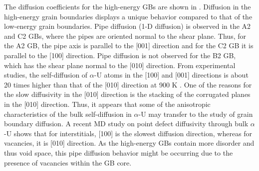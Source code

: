 \documentclass[review]{elsarticle}
\begin{document}
\par The diffusion coefficients for the high-energy GBs are shown in . Diffusion in the high-energy grain boundaries displays a unique behavior compared to that of the low-energy grain boundaries. Pipe diffusion (1-D diffusion) is observed in the A2 and C2 GBs, where the pipes are oriented normal to the shear plane. Thus, for the A2 GB, the pipe axis is parallel to the [001] direction and for the C2 GB it is parallel to the [100] direction. Pipe diffusion is not observed for the B2 GB, which has the shear plane normal to the [010] direction. From experimental studies, the self-diffusion of $\alpha$-U atoms in the [100] and [001] directions is about 20 times higher than that of the [010] direction at 900 K \cite{aniso_self_diff}. One of the reasons for the slow diffusivity in the [010] direction is the stacking of the corrugated planes in the [010] direction. Thus, it appears that some of the anisotropic characteristics of the bulk self-diffusion in $\alpha$-U may transfer to the study of grain boundary diffusion. A recent MD study \cite{WANG2023154289} on point defect diffusivity through bulk $\alpha$-U shows that for interstitials, [100] is the slowest diffusion direction, whereas for vacancies, it is [010] direction. As the high-energy GBs contain more disorder and thus void space, this pipe diffusion behavior might be occurring due to the presence of vacancies within the GB core.
\end{document}
